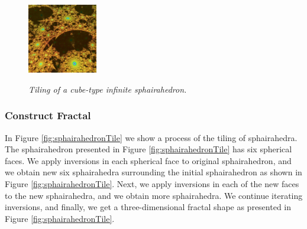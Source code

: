 \begin{figure}[h!tbp]
\begin{minipage}[t]{0.19\textwidth}
  \label{fig:terrainStep10}
 \end{minipage}
 \hspace*{\fill}
 \begin{minipage}[t]{0.19\textwidth}
  \centering
  \includegraphics[height=1.2in, keepaspectratio]{./img/application/sphairahedron/constructFractal/terrainProcess/final.jpg}
  \label{figsphairaPrismFinal}
 \end{minipage}
 \caption{\textit{Tiling of a cube-type infinite sphairahedron.}}
 \label{fig:sphairahedralPrismTile}
\end{figure}


\subsubsection{Construct Fractal}

In Figure \ref{fig:sphairahedronTile} we show a process of the tiling of
sphairahedra.
The sphairahedron presented in Figure
\ref{fig:sphairahedronTile} has six spherical
faces.
We apply inversions in each spherical face to original sphairahedron,
and we obtain new six sphairahedra surrounding the initial sphairahedron
as shown in Figure
\ref{fig:sphairahedronTile}.
Next, we apply inversions in each of the new faces to the new sphairahedra,
and we obtain more sphairahedra.
We continue iterating inversions, and finally, we get a three-dimensional
fractal shape as presented in Figure
\ref{fig:sphairahedronTile}.

